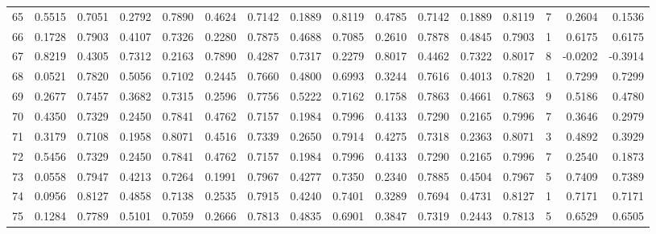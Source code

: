 \begin{tabular}{lrrrrrrrrrrrrrrr}
65  &      0.5515 &  0.7051 &  0.2792 &  0.7890 &  0.4624 &  0.7142 &  0.1889 &  0.8119 &  0.4785 &  0.7142 &   0.1889 &     0.8119 &      7 &                    0.2604 &                     0.1536 \\
66  &      0.1728 &  0.7903 &  0.4107 &  0.7326 &  0.2280 &  0.7875 &  0.4688 &  0.7085 &  0.2610 &  0.7878 &   0.4845 &     0.7903 &      1 &                    0.6175 &                     0.6175 \\
67  &      0.8219 &  0.4305 &  0.7312 &  0.2163 &  0.7890 &  0.4287 &  0.7317 &  0.2279 &  0.8017 &  0.4462 &   0.7322 &     0.8017 &      8 &                   -0.0202 &                    -0.3914 \\
68  &      0.0521 &  0.7820 &  0.5056 &  0.7102 &  0.2445 &  0.7660 &  0.4800 &  0.6993 &  0.3244 &  0.7616 &   0.4013 &     0.7820 &      1 &                    0.7299 &                     0.7299 \\
69  &      0.2677 &  0.7457 &  0.3682 &  0.7315 &  0.2596 &  0.7756 &  0.5222 &  0.7162 &  0.1758 &  0.7863 &   0.4661 &     0.7863 &      9 &                    0.5186 &                     0.4780 \\
70  &      0.4350 &  0.7329 &  0.2450 &  0.7841 &  0.4762 &  0.7157 &  0.1984 &  0.7996 &  0.4133 &  0.7290 &   0.2165 &     0.7996 &      7 &                    0.3646 &                     0.2979 \\
71  &      0.3179 &  0.7108 &  0.1958 &  0.8071 &  0.4516 &  0.7339 &  0.2650 &  0.7914 &  0.4275 &  0.7318 &   0.2363 &     0.8071 &      3 &                    0.4892 &                     0.3929 \\
72  &      0.5456 &  0.7329 &  0.2450 &  0.7841 &  0.4762 &  0.7157 &  0.1984 &  0.7996 &  0.4133 &  0.7290 &   0.2165 &     0.7996 &      7 &                    0.2540 &                     0.1873 \\
73  &      0.0558 &  0.7947 &  0.4213 &  0.7264 &  0.1991 &  0.7967 &  0.4277 &  0.7350 &  0.2340 &  0.7885 &   0.4504 &     0.7967 &      5 &                    0.7409 &                     0.7389 \\
74  &      0.0956 &  0.8127 &  0.4858 &  0.7138 &  0.2535 &  0.7915 &  0.4240 &  0.7401 &  0.3289 &  0.7694 &   0.4731 &     0.8127 &      1 &                    0.7171 &                     0.7171 \\
75  &      0.1284 &  0.7789 &  0.5101 &  0.7059 &  0.2666 &  0.7813 &  0.4835 &  0.6901 &  0.3847 &  0.7319 &   0.2443 &     0.7813 &      5 &                    0.6529 &                     0.6505 \\

\end{tabular}
